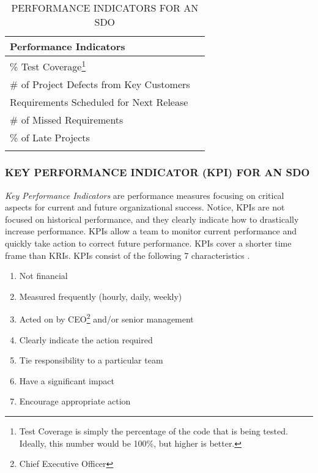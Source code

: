 \documentclass[SDSUThesis.tex]{subfiles}
\begin{document}
            \begin{longtable}{@{}l l}
                \toprule%
                 \centering%
                 {\bfseries Performance Indicators} &
                 \\
                
                \cmidrule[0.4pt](r{0.125em}){1-1}%
                \endhead
                
                \% Test Coverage\footnote{Test Coverage is simply the percentage 
                    of the code that is being tested. Ideally, this 
                    number would be 100\%, but higher is better.}   \\
                \myrowcolour%
                \# of Project Defects from Key Customers  \\
                Requirements Scheduled for Next Release  \\
                \myrowcolour%
                \# of Missed Requirements \\
                \% of Late Projects \\
                
                \bottomrule
                
                \caption{PERFORMANCE INDICATORS FOR AN SDO}
                \label{tab:PI}
            \end{longtable}
            
        \subsubsection{KEY PERFORMANCE INDICATOR (KPI) FOR AN SDO}
            \textit{Key Performance Indicators} are performance measures
            focusing on critical aspects for current and future organizational
            success.  Notice, KPIs are not focused on historical performance,
            and they clearly indicate how to drastically increase performance.
            KPIs allow a team to monitor current performance and 
            quickly take action to correct future performance.
            KPIs cover a shorter time frame than KRIs.
            KPIs consist of the following 7 characteristics \cite{parmenter2010}.
            \begin{enumerate}
                \item Not financial
                \item Measured frequently (hourly, daily, weekly)
                \item Acted on by CEO\footnote{Chief Executive Officer} 
                    and/or senior management
                \item Clearly indicate the action required
                \item Tie responsibility to a particular team
                \item Have a significant impact
                \item Encourage appropriate action
            \end{enumerate}
            
\end{document}
